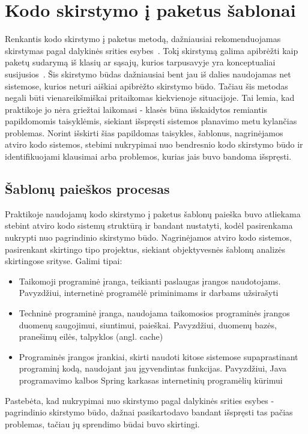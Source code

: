 \section{Kodo skirstymo į paketus šablonai}
Renkantis kodo skirstymo į paketus metodą, dažniausiai rekomenduojamas skirstymas pagal dalykinės srities esybes~\cite{DomainDrivenDesign}.
Tokį skirstymą galima apibrėžti kaip paketų sudarymą iš klasių ar sąsajų, kurios tarpusavyje yra konceptualiai susijusios~\cite{Functional}.
Šis skirstymo būdas dažniausiai bent jau iš dalies naudojamas net sistemose, kurios neturi aiškiai apibrėžto skirstymo būdo.
Tačiau šis metodas negali būti vienareikšmiškai pritaikomas kiekvienoje situacijoje.
Tai lemia, kad praktikoje jo nėra griežtai laikomasi - klasės būna išskaidytos remiantis papildomomis taisyklėmis,
siekiant išspręsti sistemos planavimo metu kylančias problemas.
Norint išskirti šias papildomas taisykles, šablonus, nagrinėjamos atviro kodo sistemos,
stebimi nukrypimai nuo bendresnio kodo skirstymo būdo ir identifikuojami klausimai arba problemos, kurias jais buvo bandoma išspręsti.

\subsection{Šablonų paieškos procesas}
Praktikoje naudojamų kodo skirstymo į paketus šablonų paieška buvo atliekama stebint atviro kodo sistemų struktūrą ir bandant nustatyti, kodėl pasirenkama nukrypti
nuo pagrindinio skirstymo būdo.
Nagrinėjamos atviro kodo sistemos, pasirenkant skirtingo tipo projektus, siekiant
objektyvesnės šablonų analizės skirtingose srityse.
Galimi tipai:
\begin{itemize}
    \item Taikomoji programinė įranga, teikianti paslaugas įrangos naudotojams. Pavyzdžiui,
    internetinė programėlė priminimams ir darbams užsirašyti
    \item Techninė programinė įranga, naudojama taikomosios programinės įrangos duomenų
    saugojimui, siuntimui, paieškai. Pavyzdžiui, duomenų bazės, pranešimų eilės, talpyklos
    (angl. cache)
    \item Programinės įrangos įrankiai, skirti naudoti kitose sistemose supaprastinant programinį
    kodą, naudojant jau įgyvendintas funkcijas. Pavyzdžiui, Java programavimo kalbos
    Spring karkasas internetinių programėlių kūrimui
\end{itemize}
Pastebėta, kad nukrypimai nuo skirstymo pagal dalykinės srities esybes - pagrindinio skirstymo būdo, dažnai pasikartodavo bandant išspręsti tas pačias problemas,
tačiau jų sprendimo būdai buvo skirtingi.

